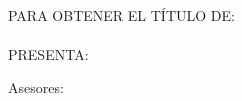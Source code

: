 \begin{titlepage}
\begin{minipage}[c][9.5cm][s]{10cm}
\begin{center}
    \vspace{3cm}

    \\[8pt]
     PARA OBTENER EL T\'ITULO DE:\\[3pt]
    \mbox{}\lacarrera\\[13pt]
    PRESENTA:\\[3pt]
    \elnombre

    \vspace{2cm}

    {\small Asesores:\\ \eldirector}

    \vspace{2cm}

    \lafecha
    
  \end{center}
\end{minipage}
\end{titlepage}
